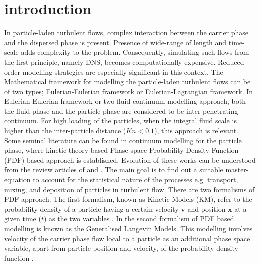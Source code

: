 \documentclass[notitlepage]{revtex4-1}
\begin{document}
\section{introduction}
In particle-laden turbulent flows, complex interaction between the carrier phase and the dispersed phase is present. Presence of wide-range of length and time-scale adds complexity to the problem. Consequently, simulating such flows from the first principle, namely DNS, becomes computationally expensive. Reduced order modelling strategies are especially significant in this context. The Mathematical framework for modelling the particle-laden turbulent flows can be of two types; Eulerian-Eulerian framework or Eulerian-Lagrangian framework. In Eulerian-Eulerian framework or two-fluid continuum modelling approach, both the fluid phase and the particle phase are considered to be inter-penetrating continuum. For high loading of the particles, when the integral fluid scale is higher than the inter-particle distance ($Kn<0.1$), this approach is relevant. Some seminal literature can be found in continuum modelling for the particle phase, where kinetic theory based Phase-space Probability Density Function (PDF) based approach is established. Evolution of these works can be understood from the review articles of \citet{reeks2014transport} and \citet{reeks2021development}. The main goal is
to find out a suitable master-equation to account for the statistical nature of the processes e.g. transport, mixing, and deposition of particles in turbulent flow. There are two formalisms of PDF approach. The first formalism, known as Kinetic Models (KM), refer to the probability density of a particle having a certain velocity $\mathbf{v}$ and position $\mathbf{x}$ at a given time ($t$) as the two variables \citep{reeks1991kinetic,reeks1992continuum,buyevich1971statistical,buyevich1972statistical1,buyevich1972statistical2}. In the second formalism of PDF based modelling is known as the
Generalised Langevin Models. This modelling involves velocity of the carrier phase flow local to a particle as an additional phase space variable, apart from particle position and velocity, of the probability density function \citep{haworth1985application,simonin1993eulerian,minier2014guidelines}. 
\end{document}
